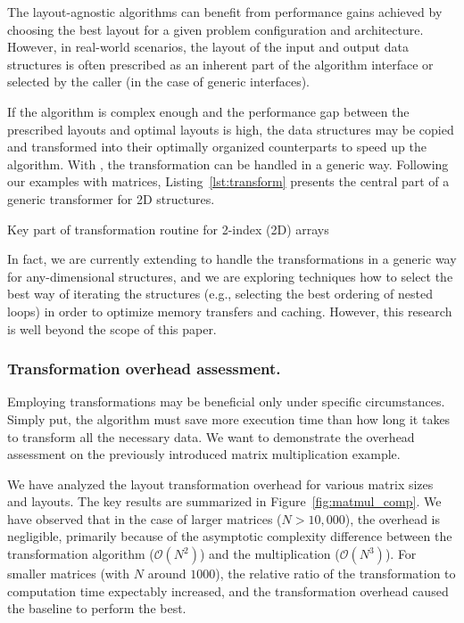 The layout-agnostic algorithms can benefit from performance gains achieved by choosing the best layout for a given problem configuration and architecture. However, in real-world scenarios, the layout of the input and output data structures is often prescribed as an inherent part of the algorithm interface or selected by the caller (in the case of generic interfaces).

If the algorithm is complex enough and the performance gap between the prescribed layouts and optimal layouts is high, the data structures may be copied and transformed into their optimally organized counterparts to speed up the algorithm. With \Noarr{}, the transformation can be handled in a generic way. Following our examples with matrices, Listing~\ref{lst:transform} presents the central part of a generic transformer for 2D structures.

\begin{listing}
    \vspace{-10pt}
    \vspace{-20pt}
    \caption{Key part of transformation routine for 2-index (2D) arrays}
    \label{lst:transform}
\end{listing}

In fact, we are currently extending \Noarr{} to handle the transformations in a generic way for any-dimensional structures, and we are exploring techniques how to select the best way of iterating the structures (e.g., selecting the best ordering of nested loops) in order to optimize memory transfers and caching. However, this research is well beyond the scope of this paper.


\subsubsection{Transformation overhead assessment.}

Employing transformations may be beneficial only under specific circumstances. Simply put, the algorithm must save more execution time than how long it takes to transform all the necessary data. We want to demonstrate the overhead assessment on the previously introduced matrix multiplication example.

We have analyzed the layout transformation overhead for various matrix sizes and layouts. The key results are summarized in Figure~\ref{fig:matmul_comp}. We have observed that in the case of larger matrices ($N>10,000$), the overhead is negligible, primarily because of the asymptotic complexity difference between the transformation algorithm ($\mathcal{O}(N^2)$) and the multiplication ($\mathcal{O}(N^3)$). For smaller matrices (with $N$ around $1000$), the relative ratio of the transformation to computation time expectably increased, and the transformation overhead caused the baseline to perform the best.

